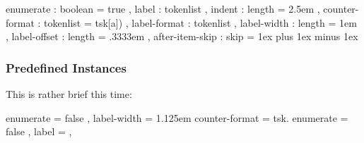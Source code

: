 \documentclass[load-preamble+]{cnltx-doc}
\begin{document}
\begin{sourcecode}
    {
      enumerate       : boolean   = true    ,
      label           : tokenlist           ,
      indent          : length    = 2.5em   ,
      counter-format  : tokenlist = tsk[a]) ,
      label-format    : tokenlist           ,
      label-width     : length    = 1em     ,
      label-offset    : length    = .3333em ,
      after-item-skip : skip      = 1ex plus 1ex minus 1ex
    }
\end{sourcecode}

\subsubsection{Predefined Instances}
This is rather brief this time:
\begin{sourcecode}
    {
      enumerate   = false ,
      label-width = 1.125em
    }
    { counter-format = tsk. }
    {
      enumerate = false       ,
      label     = \choicebox  ,
    }
\end{sourcecode}
\end{document}
